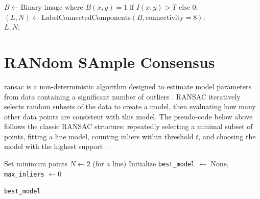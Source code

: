 \documentclass[class=report,11pt,crop=false]{standalone}
\begin{document}
\begin{algorithm}[H]
\label{alg:scikit_component_labeling}
\caption{SciKit Labeling}
$B \leftarrow \text{Binary image where } B(x, y) = 1 \text{ if } I(x, y) > T \text{ else } 0$;
$(L, N) \leftarrow \text{LabelConnectedComponents}(B, \text{connectivity}=8)$;
\\
\Return $L, N$;

\end{algorithm}



\section{RANdom SAmple Consensus}
\label{sec:ransac_theory}

\gls{ransac} is a non-deterministic algorithm designed to estimate model parameters from data containing a significant number of outliers \cite{b23}.
RANSAC iteratively selects random subsets of the data to create a model, then evaluating how many other data points are consistent with this model.
The pseudo-code below above follows the classic RANSAC structure: repeatedly selecting a minimal subset of points, fitting a line model, counting inliers within threshold \(t\), and choosing the model with the highest support \cite{b25}.


\begin{algorithm}[H]
\label{alg:ransac}
\caption{RANSAC for Line Fitting in 2D}

Set minimum points $N \leftarrow 2$ (for a line)\; 
Initialize \texttt{best\_model} $\leftarrow$ None, \texttt{max\_inliers} $\leftarrow 0$\; 


\Return \texttt{best\_model}
\end{algorithm}
\end{document}
